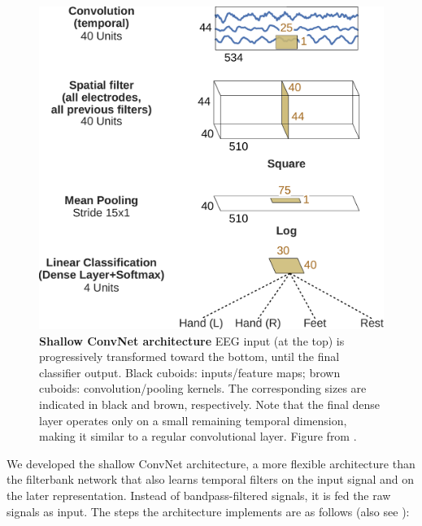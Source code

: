 \begin{figure}[ht]
    \myfloatalign
    \includegraphics[width=0.8\linewidth]{images/3D_Diagram_MatplotLib.ipynb.0.png}
    \caption[Shallow ConvNet architecture]{
    \textbf{Shallow ConvNet architecture} EEG input (at the top) is
progressively transformed toward the bottom, until the final classifier
output. Black cuboids: inputs/feature maps; brown cuboids:
convolution/pooling kernels. The corresponding sizes are indicated in
black and brown, respectively. Note that the final dense layer operates
only on a small remaining temporal dimension, making it similar to a
regular convolutional layer. Figure from
\cite{schirrmeisterdeephbm2017}.}\label{shallow-net-figure}
\end{figure}



    We developed the shallow ConvNet architecture, a more flexible
architecture than the filterbank network that also learns temporal
filters on the input signal and on the later representation. Instead of
bandpass-filtered signals, it is fed the raw signals as input. The steps
the architecture implements are as follows (also see ):

